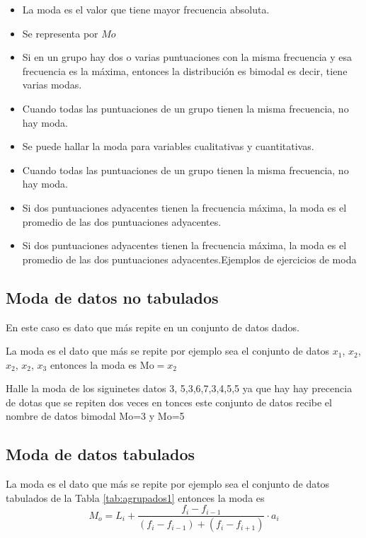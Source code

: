 \documentclass[
  11pt,
]{krantz}
\theoremstyle{definition}
\theoremstyle{definition}
\theoremstyle{definition}
\theoremstyle{definition}
\theoremstyle{remark}
\begin{document}
\begin{itemize}
\item
  La moda es el valor que tiene mayor frecuencia absoluta.
\item
  Se representa por \(Mo\)
\item
  Si en un grupo hay dos o varias puntuaciones con la misma frecuencia y esa frecuencia es la máxima, entonces la distribución es bimodal es decir, tiene varias modas.
\item
  Cuando todas las puntuaciones de un grupo tienen la misma frecuencia, no hay moda.
\item
  Se puede hallar la moda para variables cualitativas y cuantitativas.
\item
  Cuando todas las puntuaciones de un grupo tienen la misma frecuencia, no hay moda.
\item
  Si dos puntuaciones adyacentes tienen la frecuencia máxima, la moda es el promedio de las dos puntuaciones adyacentes.
\item
  Si dos puntuaciones adyacentes tienen la frecuencia máxima, la moda es el promedio de las dos puntuaciones adyacentes.Ejemplos de ejercicios de moda
\end{itemize}

\hypertarget{moda-de-datos-no-tabulados}{%
\subsection{Moda de datos no tabulados}\label{moda-de-datos-no-tabulados}}

En este caso es dato que más repite en un conjunto de datos dados.

La moda es el dato que más se repite por ejemplo sea el conjunto de datos \(x_1\), \(x_2\), \(x_2\), \(x_2\), \(x_3\) entonces la moda es \(\text{Mo}=x_2\)

Halle la moda de los siguinetes datos 3, 5,3,6,7,3,4,5,5 ya que hay hay precencia de dotas que se repiten dos veces en tonces este conjunto de datos recibe el nombre de datos bimodal Mo=3 y Mo=5

\hypertarget{moda-de-datos-tabulados}{%
\subsection{Moda de datos tabulados}\label{moda-de-datos-tabulados}}

La moda es el dato que más se repite por ejemplo sea el conjunto de datos tabulados de la Tabla \ref{tab:agrupados1} entonces la moda es \[ M_o=L_i+\frac{f_i-f_{i-1}}{(f_i-f_{i-1})+(f_i-f_{i+1})}\cdot a_i\]
\end{document}
